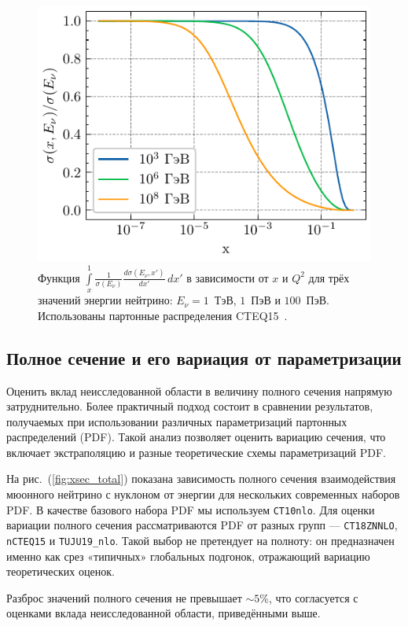 \begin{figure}[!h]
\centering
\includegraphics[width=0.8\linewidth]{images/NuProp/cdfxy_plot_CT10nlo_14.pdf}
\caption{Функция 
$\int\limits_{x}^1 \frac{1}{\sigma(E_\nu)}\frac{d\sigma(E_\nu,x')}{dx'}\,dx'$ 
в зависимости от $x$ и $Q^2$ для трёх значений энергии нейтрино: 
$E_{\nu} = 1$~ТэВ, $1$~ПэВ и $100$~ПэВ. 
Использованы партонные распределения CTEQ15~\cite{ncteq15}.}
\label{fig:CDF_x}
\end{figure}


\subsection{Полное сечение и его вариация от параметризации}

Оценить вклад неисследованной области в величину полного сечения напрямую затруднительно. 
Более практичный подход состоит в сравнении результатов, получаемых при использовании различных параметризаций партонных распределений (PDF). 
Такой анализ позволяет оценить вариацию сечения, что включает экстраполяцию и разные теоретические схемы параметризаций PDF.

На рис.~(\ref{fig:xsec_total}) показана зависимость полного сечения взаимодействия мюонного нейтрино с нуклоном от энергии для нескольких современных наборов PDF. 
В  качестве базового набора PDF мы используем \texttt{CT10nlo}. 
Для оценки вариации полного сечения рассматриваются PDF от разных групп — \texttt{CT18ZNNLO}, \texttt{nCTEQ15} и \texttt{TUJU19\_nlo}. 
Такой выбор не претендует на полноту: он предназначен именно как срез «типичных» глобальных подгонок, отражающий вариацию теоретических оценок. 

Разброс значений полного сечения не превышает $\sim5\%$, что согласуется с оценками вклада неисследованной области, приведёнными выше.

